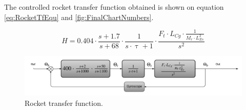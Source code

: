 The controlled rocket transfer function obtained is shown on equation \autoref{eq:RocketTfEqu} and  \autoref{fig:FinalChartNumbers}.

\begin{equation}    
H = 0.404 \cdot \frac{s + 1.7}{s + 68} \cdot \frac{1}{s \cdot \uptau + 1} \cdot \frac{F_t \cdot L_{Cg} \cdot \frac{1}{M_r \cdot L_{Es}^2}}{s^2}  
\end{equation}
\label{eq:RocketTfEqu}

\begin{figure}[htbp]
	\centering
	
	\includegraphics[width=\textwidth]{figures/Rocket/design/final_chart_number}
	\caption{Rocket transfer function.}
	\label{fig:FinalChartNumbers}
	
\end{figure}